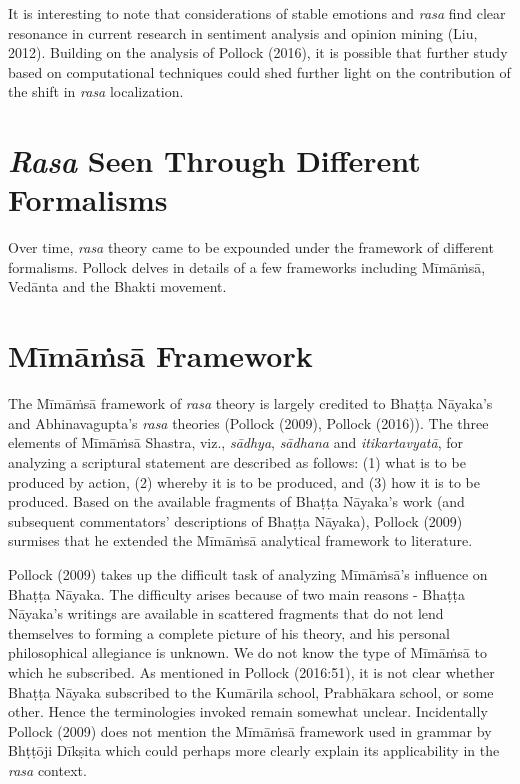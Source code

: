 It is interesting to note that considerations of stable emotions and \textsl{rasa} find clear resonance in current research in sentiment analysis and opinion mining (Liu, 2012). Building on the analysis of Pollock (2016), it is possible that further study based on computational techniques could shed further light on the contribution of the shift in \textsl{rasa} localization. 

\section*{\textsl{Rasa} Seen Through Different Formalisms}

Over time, \textsl{rasa} theory came to be expounded under the framework of different formalisms. Pollock delves in details of a few frameworks including Mīmāṁsā, Vedānta and the Bhakti movement. 

\section*{Mīmāṁsā Framework}

The Mīmāṁsā framework of \textsl{rasa} theory is largely credited to Bhaṭṭa Nāyaka’s and Abhinavagupta’s \textsl{rasa} theories (Pollock (2009), Pollock (2016)). The three elements of Mīmāṁsā Shastra, viz., \textsl{sādhya}, \textsl{sādhana} and \textsl{itikartavyatā}, for analyzing a scriptural statement are described as follows: (1) what is to be produced by action, (2) whereby it is to be produced, and (3) how it is to be produced. Based on the available fragments of Bhaṭṭa Nāyaka’s work (and subsequent commentators’ descriptions of Bhaṭṭa Nāyaka), Pollock (2009) surmises that he extended the Mīmāṁsā analytical framework to literature. 

Pollock (2009) takes up the difficult task of analyzing Mīmāṁsā’s influence on Bhaṭṭa Nāyaka. The difficulty arises because of two main reasons - Bhaṭṭa Nāyaka’s writings are available in scattered fragments that do not lend themselves to forming a complete picture of his theory, and his personal philosophical allegiance is unknown. We do not know the type of Mīmāṁsā to which he subscribed. As mentioned in Pollock (2016:51), it is not clear whether Bhaṭṭa Nāyaka subscribed to the Kumārila school, Prabhākara school, or some other. Hence the terminologies invoked remain somewhat unclear. Incidentally Pollock (2009) does not mention the Mīmāṁsā framework used in grammar by Bhṭṭōji Dīkṣita which could perhaps more clearly explain its applicability in the \textsl{rasa} context. 

